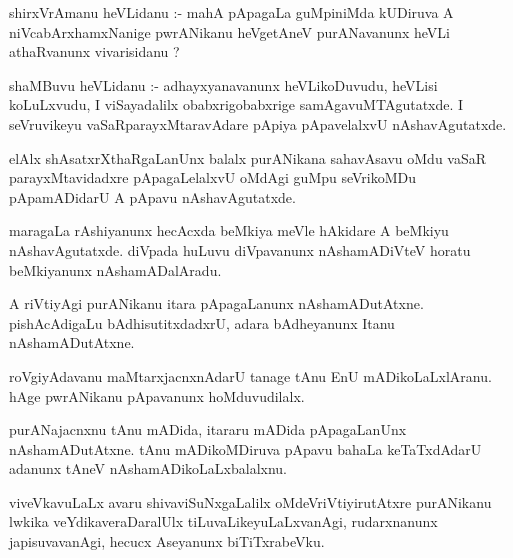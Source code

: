 \documentclass{article}
\begin{document}


\begin{mn}
shirxVrAmanu  heVLidanu :- mahA  pApagaLa  guMpiniMda  kUDiruva  A  niVcabArxhamxNanige  pwrANikanu  heVgetAneV  
purANavanunx  heVLi  athaRvanunx  vivarisidanu ?
\end{mn}

\begin{mn}
shaMBuvu  heVLidanu :- adhayxyanavanunx  heVLikoDuvudu,  heVLisi koLuLxvudu,  I  viSayadalilx  obabxrigobabxrige  
samAgavuMTAgutatxde.  I  seVruvikeyu  vaSaRparayxMtaravAdare  pApiya  pApavelalxvU  nAshavAgutatxde.
\end{mn}

\begin{mn}
elAlx  shAsatxrXthaRgaLanUnx  balalx  purANikana  sahavAsavu  oMdu  vaSaR  parayxMtavidadxre  pApagaLelalxvU  
oMdAgi  guMpu  seVrikoMDu  pApamADidarU  A  pApavu  nAshavAgutatxde.
\end{mn}

\begin{mn}
maragaLa  rAshiyanunx  hecAcxda  beMkiya  meVle  hAkidare  A  beMkiyu  nAshavAgutatxde.  diVpada  huLuvu  
diVpavanunx  nAshamADiVteV  horatu  beMkiyanunx  nAshamADalAradu.
\end{mn}

\begin{mn}
A riVtiyAgi  purANikanu  itara  pApagaLanunx  nAshamADutAtxne.  pishAcAdigaLu  bAdhisutitxdadxrU,  
adara  bAdheyanunx  Itanu  nAshamADutAtxne.
\end{mn}

\begin{mn}
roVgiyAdavanu  maMtarxjacnxnAdarU  tanage  tAnu  EnU  mADikoLaLxlAranu.  hAge  pwrANikanu  pApavanunx  hoMduvudilalx.  
\end{mn}

\begin{mn}
purANajacnxnu  tAnu  mADida, itararu  mADida  pApagaLanUnx  nAshamADutAtxne.  tAnu  mADikoMDiruva  pApavu  
bahaLa  keTaTxdAdarU  adanunx  tAneV  nAshamADikoLaLxbalalxnu.
\end{mn}

\begin{mn}
viveVkavuLaLx   avaru  shivaviSuNxgaLalilx  oMdeVriVtiyirutAtxre  purANikanu  lwkika  veYdikaveraDaralUlx  
tiLuvaLikeyuLaLxvanAgi,  rudarxnanunx  japisuvavanAgi,  hecucx  Aseyanunx  biTiTxrabeVku.
\end{mn}
\end{document}
